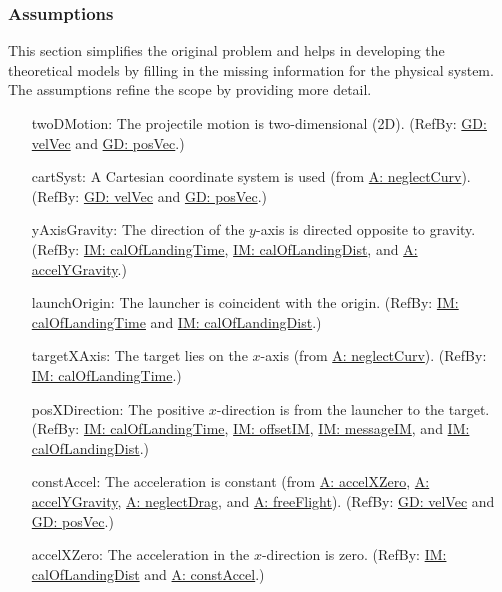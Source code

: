 \documentclass[12pt]{article}
\begin{document}
\subsubsection{Assumptions}
\label{Sec:Assumps}
This section simplifies the original problem and helps in developing the theoretical models by filling in the missing information for the physical system. The assumptions refine the scope by providing more detail.
\begin{itemize}
\item[twoDMotion:\phantomsection\label{twoDMotion}]{The projectile motion is two-dimensional (2D). (RefBy: \hyperref[GD:velVec]{GD: velVec} and \hyperref[GD:posVec]{GD: posVec}.)}
\item[cartSyst:\phantomsection\label{cartSyst}]{A Cartesian coordinate system is used (from \hyperref[neglectCurv]{A: neglectCurv}). (RefBy: \hyperref[GD:velVec]{GD: velVec} and \hyperref[GD:posVec]{GD: posVec}.)}
\item[yAxisGravity:\phantomsection\label{yAxisGravity}]{The direction of the $y$-axis is directed opposite to gravity. (RefBy: \hyperref[IM:calOfLandingTime]{IM: calOfLandingTime}, \hyperref[IM:calOfLandingDist]{IM: calOfLandingDist}, and \hyperref[accelYGravity]{A: accelYGravity}.)}
\item[launchOrigin:\phantomsection\label{launchOrigin}]{The launcher is coincident with the origin. (RefBy: \hyperref[IM:calOfLandingTime]{IM: calOfLandingTime} and \hyperref[IM:calOfLandingDist]{IM: calOfLandingDist}.)}
\item[targetXAxis:\phantomsection\label{targetXAxis}]{The target lies on the $x$-axis (from \hyperref[neglectCurv]{A: neglectCurv}). (RefBy: \hyperref[IM:calOfLandingTime]{IM: calOfLandingTime}.)}
\item[posXDirection:\phantomsection\label{posXDirection}]{The positive $x$-direction is from the launcher to the target. (RefBy: \hyperref[IM:calOfLandingTime]{IM: calOfLandingTime}, \hyperref[IM:offsetIM]{IM: offsetIM}, \hyperref[IM:messageIM]{IM: messageIM}, and \hyperref[IM:calOfLandingDist]{IM: calOfLandingDist}.)}
\item[constAccel:\phantomsection\label{constAccel}]{The acceleration is constant (from \hyperref[accelXZero]{A: accelXZero}, \hyperref[accelYGravity]{A: accelYGravity}, \hyperref[neglectDrag]{A: neglectDrag}, and \hyperref[freeFlight]{A: freeFlight}). (RefBy: \hyperref[GD:velVec]{GD: velVec} and \hyperref[GD:posVec]{GD: posVec}.)}
\item[accelXZero:\phantomsection\label{accelXZero}]{The acceleration in the $x$-direction is zero. (RefBy: \hyperref[IM:calOfLandingDist]{IM: calOfLandingDist} and \hyperref[constAccel]{A: constAccel}.)}

\end{itemize}
\end{document}
